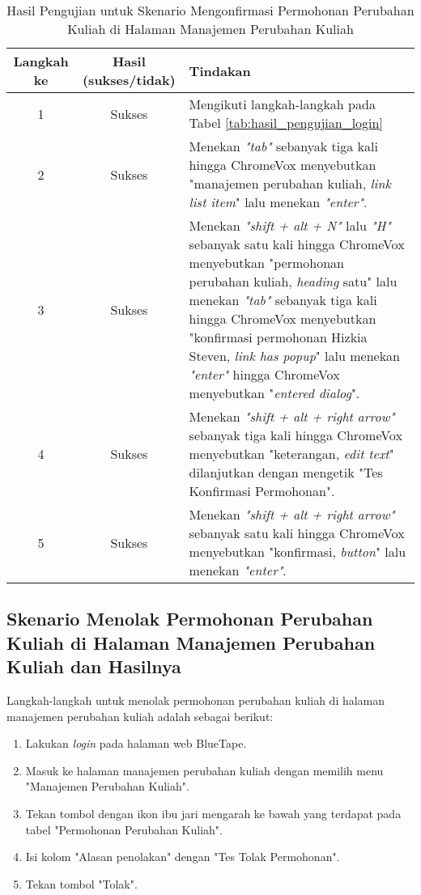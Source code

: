 \begin{table}[H]
    \centering 
    \caption{Hasil Pengujian untuk Skenario Mengonfirmasi Permohonan Perubahan Kuliah di Halaman Manajemen Perubahan Kuliah}
    \label{tab:hasil_pengujian_mengonfirmasi_permohonan_perubahan_kuliah_di_halaman_manajemen_perubahan_kuliah}
    \begin{tabular}{|c|c|p{10cm}|}
        \toprule
        Langkah ke & Hasil (sukses/tidak) & Tindakan \\

        \midrule
        1 & Sukses & Mengikuti langkah-langkah pada Tabel \ref{tab:hasil_pengujian_login} \\
        2 & Sukses & Menekan \textit{"tab"} sebanyak tiga kali hingga ChromeVox menyebutkan "manajemen perubahan kuliah, \textit{link list item}" lalu menekan \textit{"enter"}. \\
        3 & Sukses & Menekan \textit{"shift + alt + N"} lalu \textit{"H"} sebanyak satu kali hingga ChromeVox menyebutkan "permohonan perubahan kuliah, \textit{heading} satu" lalu menekan \textit{"tab"} sebanyak tiga kali hingga ChromeVox menyebutkan "konfirmasi permohonan Hizkia Steven, \textit{link has popup}" lalu menekan \textit{"enter"} hingga ChromeVox menyebutkan "\textit{entered dialog}". \\
        4 & Sukses & Menekan \textit{"shift + alt + right arrow"} sebanyak tiga kali hingga ChromeVox menyebutkan "keterangan, \textit{edit text}" dilanjutkan dengan mengetik "Tes Konfirmasi Permohonan". \\
        5 & Sukses & Menekan \textit{"shift + alt + right arrow"} sebanyak satu kali hingga ChromeVox menyebutkan "konfirmasi, \textit{button}" lalu menekan \textit{"enter"}. \\ 

        \bottomrule

    \end{tabular}
\end{table}

\subsection{Skenario Menolak Permohonan Perubahan Kuliah di Halaman Manajemen Perubahan Kuliah dan Hasilnya}
\label{subsec:skenario_menolak_permohonan_perubahan_kuliah_di_halaman_manajemen_perubahan_kuliah}
Langkah-langkah untuk menolak permohonan perubahan kuliah di halaman manajemen perubahan kuliah adalah sebagai berikut:

\begin{enumerate}
    \item Lakukan \textit{login} pada halaman web BlueTape.
    \item Masuk ke halaman manajemen perubahan kuliah dengan memilih menu "Manajemen Perubahan Kuliah".
    \item Tekan tombol dengan ikon ibu jari mengarah ke bawah yang terdapat pada tabel "Permohonan Perubahan Kuliah".
    \item Isi kolom "Alasan penolakan" dengan "Tes Tolak Permohonan".
    \item Tekan tombol "Tolak".
\end{enumerate}

